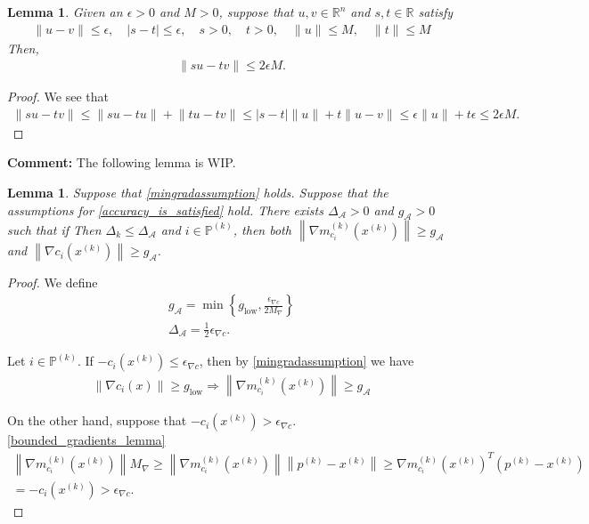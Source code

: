 \documentclass{article}
\newenvironment{comment}
  {\par\medskip
   \color{red}%
   \begin{framed}
   \textbf{Comment: }\ignorespaces}
 {\end{framed}
  \medskip}
\newtheorem{lemma}[theorem]{Lemma}
\theoremstyle{case}
\numberwithin{theorem}{subsection}
\newcommand{\dk}{\Delta_k}
\newcommand{\gmcik}{{\nabla m_{c_i}^{(k)}\left(\xk\right)}}
\newcommand{\maxgrad}{{M_{\nabla}}}
\newcommand{\minactivegraddelta}{{\Delta_{\mathcal A}}}
\newcommand{\minactivegrad}{{ g_{\mathcal A} }}
\newcommand{\mingradepsilon}{{\epsilon_{\nabla c}}}
\newcommand{\mingrad}{{ g_{\textrm{low}} }}
\newcommand{\reals}{\mathbb R}
\newcommand{\Rn}{\mathbb R^n}
\newcommand{\xk}{{x^{(k)}}}
\newcommand{\projk}{{p^{(k)}}}
\newcommand{\activeprojk}{{\mathbb P^{(k)}}}
\begin{document}
\begin{lemma}
\label{the_simple_bound_one}
Given an $\epsilon > 0$ and $M > 0$, suppose that $u,v \in \Rn$ and $s,t \in \reals$ satisfy
\begin{align}
\|u - v \| \le \epsilon, \quad
|s - t | \le \epsilon, \quad
s > 0, \quad
t > 0, \quad
\|u\| \le M, \quad
\|t\| \le M
\end{align}
Then,
\begin{align}
\bigg\|su - tv\bigg\| \le 2\epsilon M.
\end{align}
\end{lemma}


\begin{proof}
We see that
\begin{align}
\bigg\|su - tv\bigg\| \le \bigg\|su - tu\bigg\| + \bigg\|tu- tv\bigg\| \le |s - t| \|u\| + t \|u - v\| \le \epsilon \|u\| + t \epsilon \le 2 \epsilon M.
\end{align}
\end{proof}



\begin{comment}
The following lemma is WIP.
\end{comment}

\begin{lemma}
\label{active_gradients_bounded_below}
Suppose that \cref{mingradassumption} holds.
Suppose that the assumptions for \cref{accuracy_is_satisfied} hold.
There exists $\minactivegraddelta > 0$ and $\minactivegrad > 0$ such that if 
Then $\dk \le \minactivegraddelta$ and $i \in \activeprojk$, then both
$\left\|\gmcik\right\| \ge \minactivegrad$
and
$\left\|\nabla c_i\left(\xk\right)\right\| \ge \minactivegrad$.
\end{lemma}
\begin{proof}
We define
\begin{align}
\minactivegrad = \min\left\{\mingrad, \frac {\mingradepsilon} {2 \maxgrad}  \right\} \label{define_minactivegrad} \\
\minactivegraddelta = \frac 1 2 \mingradepsilon \label{define_minactivedelta}.
\end{align}

Let $i \in \activeprojk$.
If $-c_i\left(\xk\right) \le \mingradepsilon$, then by \cref{mingradassumption} we have 
\begin{align*}
\left\|\nabla c_i(x)\right\| \ge \mingrad 
\Longrightarrow \left\| \gmcik \right\| \ge \minactivegrad
\end{align*}

On the other hand, suppose that $-c_i\left(\xk\right) > \mingradepsilon$.
\cref{bounded_gradients_lemma}
\begin{align*}
\left\|\gmcik\right\| \maxgrad \ge \left\|\gmcik\right\|\left\|\projk - \xk\right\|
\ge \gmcik^T\left(\projk - \xk\right) \\
= -c_i(\xk) > \mingradepsilon.
\end{align*}
\end{proof}
\end{document}
